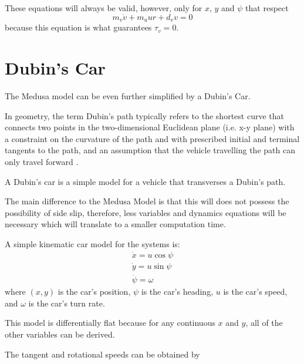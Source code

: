 \par These equations will always be valid, however, only for $x$, $y$ and $\psi$ that respect
\begin{equation}
    m_v \dot{v} + m_u u r + d_v v = 0
    \label{eq:onlymandatoryconstraint}
\end{equation}
because this equation is what guarantees $\tau_v = 0$. 


\section{Dubin's Car}
\label{sec:dubincarequations}

\par The Medusa model can be even further simplified by a Dubin's Car.
\par In geometry, the term Dubin's path typically refers to the shortest curve that connects two points in the two-dimensional Euclidean plane (i.e. x-y plane) with a constraint on the curvature of the path and with prescribed initial and terminal tangents to the path, and an assumption that the vehicle travelling the path can only travel forward \cite{Reeds1990OPTIMALPF}. 
\par A Dubin's car is a simple model for a vehicle that transverses a Dubin's path.
\par The main difference to the Medusa Model is that this will does not possess the possibility of side slip, therefore, less variables and dynamics equations will be necessary which will translate to a smaller computation time.

\par A simple kinematic car model for the systems is: 
\begin{equation}
    \begin{gathered}
        \dot{x} = u \cos \psi \\
        \dot{y} = u \sin \psi \\
        \dot{\psi} = \omega
    \end{gathered}
\end{equation}
where $(x,y)$ is the car's position, $\psi$ is the car's heading, $u$ is the car's speed, and $\omega$ is the car's turn rate.

\par This model is differentially flat because for any continuous $x$ and $y$, all of the other variables can be derived.
\par The tangent and rotational speeds can be obtained by
    
